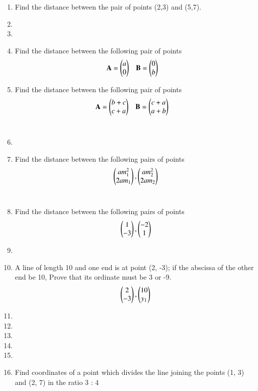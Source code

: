 \renewcommand{\theequation}{\theenumi}
\renewcommand{\thefigure}{\theenumi}
\begin{enumerate}[label=\thesubsection.\arabic*.,ref=\thesubsection.\theenumi]

\item Find the distance between the pair of points (2,3) and (5,7). 
\\
\solution
%
\item 


\item 
\item 
Find the distance between the following pair of points
\begin{align}
\mathbf{A}&=\begin{pmatrix}a\\0\end{pmatrix} & \mathbf{B}&=\begin{pmatrix}0\\b\end{pmatrix}
\end{align}
\solution
		
\item 
Find the distance between the following pair of points
\begin{align}
\mathbf{A}&=\begin{pmatrix}b+c\\c+a\end{pmatrix} & \mathbf{B}&=\begin{pmatrix}c+a\\a+b\end{pmatrix}
\end{align}
\\
\solution

\item 
\item 
Find the distance between the following pairs of points
\begin{align}
\begin{pmatrix}am_1^2\\2am_1\end{pmatrix}, \begin{pmatrix}am_2^2\\2am_2\end{pmatrix}
\end{align}
\\
\solution
	
\item 
Find the distance between the following pairs of points
\begin{align}
\begin{pmatrix}1\\-3\end{pmatrix}, \begin{pmatrix}-2\\1\end{pmatrix}
\end{align}
\solution
	
\item 
\item 
A line of length 10 and one end is at point (2, -3); if the abscissa of the other end be 10, Prove that its ordinate must be 3 or -9.
\begin{align}
\begin{pmatrix}2\\-3\end{pmatrix}, \begin{pmatrix}10\\y_1\end{pmatrix} \label{eq:1}
\end{align}
\solution
%	
\item 
\item 
\item 
\item 
\item 
\item 
Find coordinates of a point which divides the line joining the points (1, 3) and (2, 7) in the ratio 3 : 4
\\
\solution
		
 

\end{enumerate}
